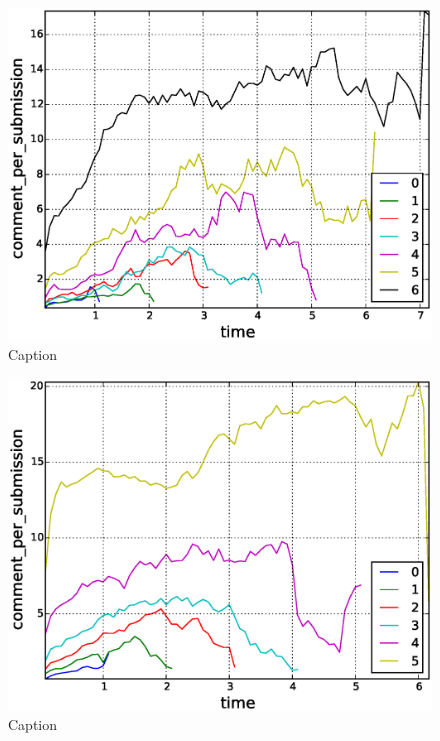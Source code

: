 \begin{figure}[!tb]
\centering
\includegraphics[scale=0.4]{./images/comments_per_submissions_for_surviving_year_for_2008.eps}
\caption{Caption}
\label{fig:comments_per_submissions_for_surviving_year_for_2008}
\end{figure}

\begin{figure}[!tb]
\centering
\includegraphics[scale=0.4]{./images/comments_per_submissions_for_surviving_year_for_2009.eps}
\caption{Caption}
\label{fig:comments_per_submissions_for_surviving_year_for_2009}
\end{figure}

